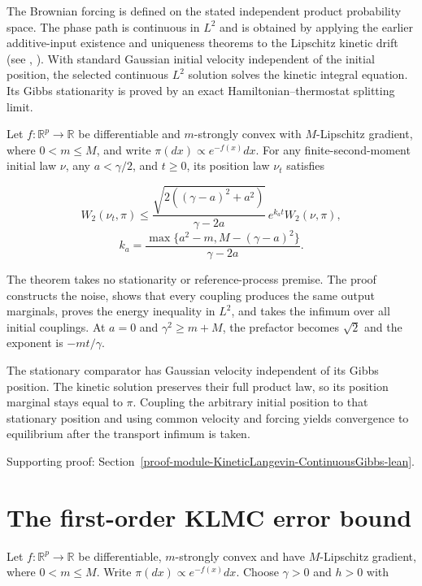 \documentclass[11pt,a4paper]{report}
\begin{document}
The Brownian forcing is defined on the stated independent product probability space. The phase path is continuous in \(L^2\) and is obtained by applying the earlier additive-input existence and uniqueness theorems to the Lipschitz kinetic drift (see \cite[Section~3.14.3]{LangevinLean2026ULASC}, \cite[Section~3.43.2]{LangevinLean2026ULASC}). With standard Gaussian initial velocity independent of the initial position, the selected continuous \(L^2\) solution solves the kinetic integral equation. Its Gibbs stationarity is proved by an exact Hamiltonian–thermostat splitting limit.




Let \(f:\mathbb R^p\to\mathbb R\) be differentiable and \(m\)-strongly convex with \(M\)-Lipschitz gradient, where \(0<m\le M\), and write \(\pi(dx)\propto e^{-f(x)}dx\). For any finite-second-moment initial law \(\nu\), any \(a<\gamma/2\), and \(t\ge0\), its position law \(\nu_t\) satisfies


\[W_2(\nu_t,\pi)\le \frac{\sqrt{2((\gamma-a)^2+a^2)}}{\gamma-2a}\,e^{k_at}W_2(\nu,\pi),\]
\[k_a=\frac{\max\{a^2-m,M-(\gamma-a)^2\}}{\gamma-2a}.\]


The theorem takes no stationarity or reference-process premise. The proof constructs the noise, shows that every coupling produces the same output marginals, proves the energy inequality in \(L^2\), and takes the infimum over all initial couplings. At \(a=0\) and \(\gamma^2\ge m+M\), the prefactor becomes \(\sqrt2\) and the exponent is \(-mt/\gamma\).



The stationary comparator has Gaussian velocity independent of its Gibbs position. The kinetic solution preserves their full product law, so its position marginal stays equal to \(\pi\). Coupling the arbitrary initial position to that stationary position and using common velocity and forcing yields convergence to equilibrium after the transport infimum is taken.


{\small\color{gray}Supporting proof: Section~\ref{proof-module-KineticLangevin-ContinuousGibbs-lean}.\par}
\section{\texorpdfstring{The first-order KLMC error bound}{The first-order KLMC error bound}}


Let \(f:\mathbb R^p\to\mathbb R\) be differentiable,
\(m\)-strongly convex and have \(M\)-Lipschitz gradient, where
\(0<m\le M\). Write \(\pi(dx)\propto e^{-f(x)}dx\).
Choose \(\gamma>0\) and \(h>0\) with
\end{document}

